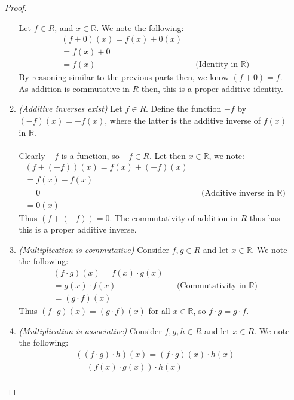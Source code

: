 \documentclass[12pt]{article}
\newenvironment{ex}[2][Exercise]{\begin{trivlist}
\item[\hskip \labelsep {\bfseries #1}\hskip \labelsep {\bfseries #2.}]}{\end{trivlist}}
\begin{document}
\begin{ex}{1}
\begin{enumerate}[label=(\alph*)]
\begin{proof}
\begin{enumerate}[label=(\roman*)]
             Let $f \in R$, and $x \in \mathbb{R}$. We note the following:
             \begin{align*}
                (f + 0)(x) = f(x) + 0(x) \\
                = f(x) + 0 \\
                = f(x) && \text{(Identity in }\mathbb{R})
             \end{align*}
             By reasoning similar to the previous parts then, we know $(f + 0) = f$. As addition is commutative in $R$ then, this is a proper additive identity.
             \item \textit{(Additive inverses exist)} Let $f \in R$. Define the function $-f$ by $(-f)(x) = -f(x)$, where the latter is the additive inverse of $f(x)$ in $\mathbb{R}$.  \\ \\
             Clearly $-f$ is a function, so $-f \in R$. Let then $x \in \mathbb{R}$, we note:
             \begin{align*}
                (f + (-f))(x) = f(x) + (-f)(x) \\
                = f(x) - f(x) \\
                = 0 && \text{(Additive inverse in }\mathbb{R}) \\
                = 0(x)
             \end{align*}
             Thus $(f + (-f)) = 0$. The commutativity of addition in $R$ thus has this is a proper additive inverse.
             \item \textit{(Multiplication is commutative)} Consider $f, g \in R$ and let $x \in \mathbb{R}$. We note the following:
            \begin{align*}
                (f \cdot g)(x) = f(x) \cdot g(x) \\
                = g(x) \cdot f(x) && \text{(Commutativity in }\mathbb{R}) \\
                = (g \cdot f)(x) 
            \end{align*}
            Thus $(f \cdot g)(x) = (g \cdot f)(x)$ for all $x \in \mathbb{R}$, so $f \cdot g = g \cdot f$. 
             \item \textit{(Multiplication is associative)} Consider $f, g, h \in R$ and let $x \in R$. We note the following:
             \begin{align*}
                ((f \cdot g) \cdot h)(x) = (f \cdot g)(x) \cdot h(x) \\
                = (f(x) \cdot g(x)) \cdot h(x) \\

\end{align*}
\end{enumerate}
\end{proof}
\end{enumerate}
\end{ex}
\end{document}
